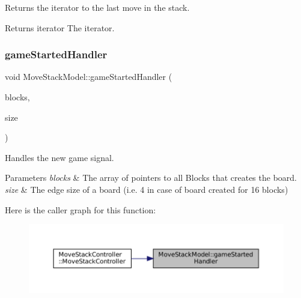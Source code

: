 Returns the iterator to the last move in the stack. 

\begin{DoxyReturn}{Returns}
iterator The iterator. 
\end{DoxyReturn}
\mbox{\label{class_move_stack_model_a5a5d359de832234daceef5e216120b65}} 
\subsubsection{\texorpdfstring{gameStartedHandler}{gameStartedHandler}}
{\footnotesize\ttfamily void Move\+Stack\+Model\+::game\+Started\+Handler (\begin{DoxyParamCaption}\item[{const std\+::vector$<$ std\+::shared\+\_\+ptr$<$ \mbox{\hyperlink{class_block}{Block}}$<$ \mbox{\hyperlink{class_block_layout_item}{Block\+Layout\+Item}} $>$$>$$>$ \&}]{blocks,  }\item[{const size\+\_\+t \&}]{size }\end{DoxyParamCaption})\hspace{0.3cm}{\ttfamily [slot]}}



Handles the new game signal. 


\begin{DoxyParams}{Parameters}
{\em blocks} & The array of pointers to all Blocks that creates the board. \\
\hline
{\em size} & The edge size of a board (i.\+e. 4 in case of board created for 16 blocks) \\
\hline
\end{DoxyParams}
Here is the caller graph for this function\+:
\nopagebreak
\begin{figure}[H]
\begin{center}
\leavevmode
\includegraphics[width=350pt]{class_move_stack_model_a5a5d359de832234daceef5e216120b65_icgraph}
\end{center}
\end{figure}
\mbox{\label{class_move_stack_model_a7fba5a7c9c8cca32112274c87b45fa82}} 
